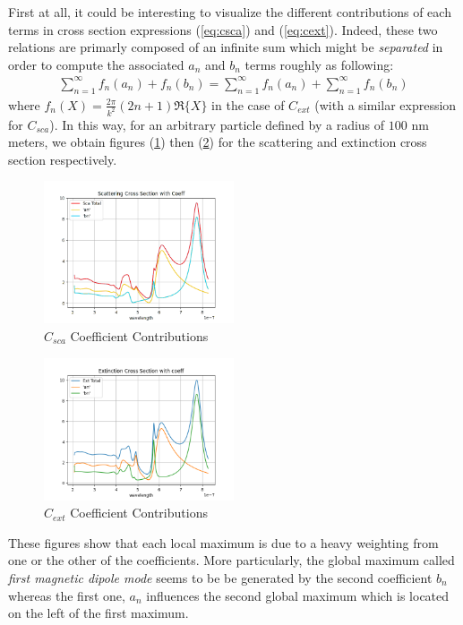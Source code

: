 \documentclass{article}
\numberwithin{equation}{section}
\begin{document}
First at all, it could be interesting to visualize the different contributions of each terms in cross section expressions (\ref{eq:csca}) and (\ref{eq:cext}). Indeed, these two relations are primarly composed of an infinite sum which might be \textit{separated} in order to compute the associated $a_{n}$ and $b_{n}$ terms roughly as following:
\begin{align}
\sum_{n=1}^{\infty } f_{n}(a_{n}) + f_{n}(b_{n}) = \sum_{n=1}^{\infty } f_{n}(a_{n}) + \sum_{n=1}^{\infty } f_{n}(b_{n})
\end{align}
where $f_{n}(X) = \frac{2\pi}{k^{2}}(2n+1)\Re\{X\}$ in the case of $C_{ext}$ (with a similar expression for $C_{sca}$). In this way, for an arbitrary particle defined by a radius of $100$ nm meters, we obtain figures (\ref{fig:sca_coeff}) then (\ref{fig:ext_coeff}) for the scattering and extinction cross section respectively.
\begin{figure}[h!]
    \centering
    \includegraphics[width=0.5\textwidth, height=0.4\textwidth]{sca_coeff.png}
    \caption{$C_{sca}$ Coefficient Contributions}
    \label{fig:sca_coeff}
\end{figure}
\begin{figure}[h!]
    \centering
    \includegraphics[width=0.5\textwidth, height=0.4\textwidth]{ext_coeff.png}
    \caption{$C_{ext}$ Coefficient Contributions}
    \label{fig:ext_coeff}
\end{figure}
These figures show that each local maximum is due to a heavy weighting from one or the other of the coefficients. More particularly, the global maximum called \textit{first magnetic dipole mode} seems to be be generated by the second coefficient $b_{n}$ whereas the first one, $a_{n}$ influences the second global maximum which is located on the left of the first maximum.
\end{document}
